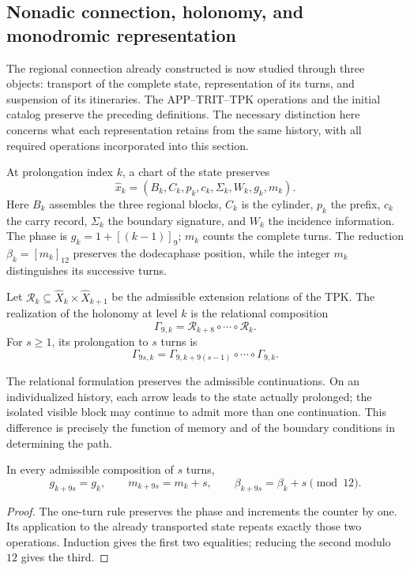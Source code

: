 \subsection{Nonadic connection, holonomy, and monodromic representation}
\label{mono-ampl:conexion}

The regional connection already constructed is now studied through three
objects: transport of the complete state, representation of its turns, and
suspension of its itineraries. The APP--TRIT--TPK operations and the initial
catalog preserve the preceding definitions. The necessary distinction here
concerns what each representation retains from the same history, with all
required operations incorporated into this section.

At prolongation index \(k\), a chart of the state preserves
\[
 \widehat x_k=(B_k,C_k,p_k,c_k,\Sigma_k,W_k,g_k,m_k).
\]
Here \(B_k\) assembles the three regional blocks, \(C_k\) is the cylinder,
\(p_k\) the prefix, \(c_k\) the carry record, \(\Sigma_k\) the boundary
signature, and \(W_k\) the incidence information. The phase is
\(g_k=1+[(k-1)]_9\); \(m_k\) counts the complete turns. The reduction
\(\beta_k=[m_k]_{12}\) preserves the dodecaphase position, while the
integer \(m_k\) distinguishes its successive turns.

\begin{definition}
\label{mono-ampl:def-vuelta}
Let \(\mathcal R_k\subseteq\widehat X_k\times\widehat X_{k+1}\)
be the admissible extension relations of the TPK. The realization of the
holonomy at level \(k\) is the relational composition
\[
 \Gamma_{9,k}=\mathcal R_{k+8}\circ\cdots\circ\mathcal R_k.
\]
For \(s\geq1\), its prolongation to \(s\) turns is
\[
 \Gamma_{9s,k}=
 \Gamma_{9,k+9(s-1)}\circ\cdots\circ\Gamma_{9,k}.
\]
\end{definition}

The relational formulation preserves the admissible continuations. On an
individualized history, each arrow leads to the state actually prolonged;
the isolated visible block may continue to admit more than one continuation.
This difference is precisely the function of memory and of the boundary
conditions in determining the path.

\begin{proposition}
\label{mono-ampl:vueltas}
In every admissible composition of \(s\) turns,
\[
 g_{k+9s}=g_k,\qquad m_{k+9s}=m_k+s,\qquad
 \beta_{k+9s}=\beta_k+s\pmod{12}.
\]
\end{proposition}
\begin{proof}
The one-turn rule preserves the phase and increments the counter by one.
Its application to the already transported state repeats exactly those two
operations. Induction gives the first two equalities; reducing the second
modulo \(12\) gives the third.
\end{proof}

